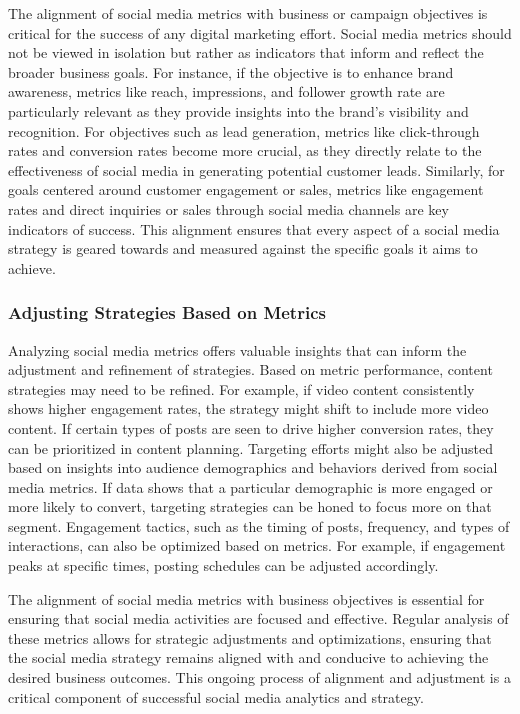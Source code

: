 \documentclass[
]{book}
\begin{document}
The alignment of social media metrics with business or campaign objectives is critical for the success of any digital marketing effort. Social media metrics should not be viewed in isolation but rather as indicators that inform and reflect the broader business goals. For instance, if the objective is to enhance brand awareness, metrics like reach, impressions, and follower growth rate are particularly relevant as they provide insights into the brand's visibility and recognition. For objectives such as lead generation, metrics like click-through rates and conversion rates become more crucial, as they directly relate to the effectiveness of social media in generating potential customer leads. Similarly, for goals centered around customer engagement or sales, metrics like engagement rates and direct inquiries or sales through social media channels are key indicators of success. This alignment ensures that every aspect of a social media strategy is geared towards and measured against the specific goals it aims to achieve.

\hypertarget{adjusting-strategies-based-on-metrics}{%
\subsubsection*{Adjusting Strategies Based on Metrics}\label{adjusting-strategies-based-on-metrics}}

Analyzing social media metrics offers valuable insights that can inform the adjustment and refinement of strategies. Based on metric performance, content strategies may need to be refined. For example, if video content consistently shows higher engagement rates, the strategy might shift to include more video content. If certain types of posts are seen to drive higher conversion rates, they can be prioritized in content planning. Targeting efforts might also be adjusted based on insights into audience demographics and behaviors derived from social media metrics. If data shows that a particular demographic is more engaged or more likely to convert, targeting strategies can be honed to focus more on that segment. Engagement tactics, such as the timing of posts, frequency, and types of interactions, can also be optimized based on metrics. For example, if engagement peaks at specific times, posting schedules can be adjusted accordingly.

The alignment of social media metrics with business objectives is essential for ensuring that social media activities are focused and effective. Regular analysis of these metrics allows for strategic adjustments and optimizations, ensuring that the social media strategy remains aligned with and conducive to achieving the desired business outcomes. This ongoing process of alignment and adjustment is a critical component of successful social media analytics and strategy.
\end{document}
